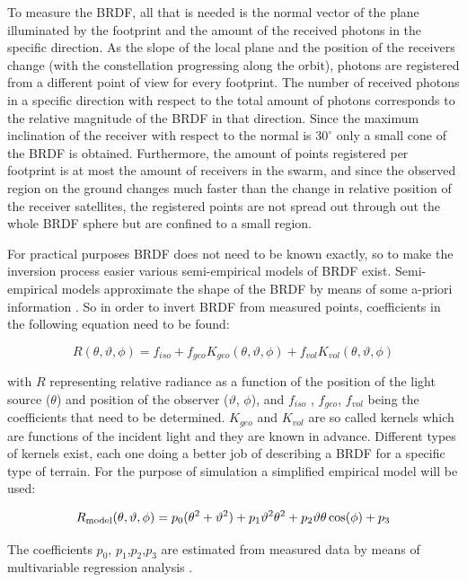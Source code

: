 To measure the \ac{BRDF}, all that is needed is the normal vector of the plane illuminated by the footprint and the amount of the received photons in the specific direction. As the slope of the local plane and the position of the receivers change (with the constellation progressing along the orbit), photons are registered from a different point of view for every footprint. The number of received photons in a specific direction with respect to the total amount of photons corresponds to the relative magnitude of the \ac{BRDF} in that direction. Since the maximum inclination of the receiver with respect to the normal is $30^\circ$ only a small cone of the \ac{BRDF} is obtained. Furthermore, the amount of points registered per footprint is at most the amount of receivers in the swarm, and since the observed region on the ground changes much faster than the change in relative position of the receiver satellites, the registered points are not spread out through out the whole \ac{BRDF} sphere but are confined to a small region. 

For practical purposes \ac{BRDF} does not need to be known exactly, so to make the inversion process easier various semi-empirical models of \ac{BRDF} exist. Semi-empirical models approximate the shape of the \ac{BRDF} by means of some a-priori information \cite{BRDFwanner}. So in order to invert \ac{BRDF} from measured points, coefficients in the following equation need to be found:

\[
R(\theta ,\vartheta ,\phi ) = f_{iso}  + f_{geo} K_{geo} (\theta ,\vartheta ,\phi ) + f_{vol} K_{vol} (\theta ,\vartheta ,\phi )
\]


with $R$ representing relative radiance as a function of the position of the light source ($\theta$) and position of the observer ($\vartheta$, $\phi$), and $f_{iso}$  , $f_{geo}$, $f_{vol}$  being the coefficients that need to be determined. $K_{geo}$ and $K_{vol}$ are so called kernels which are functions of the incident light and they are known in advance. Different types of kernels exist, each one doing a better job of describing a BRDF for a specific type of terrain. 
For the purpose of simulation a simplified empirical model will be used:

\[
R_{{\rm{model}}} (\theta ,\vartheta ,\phi ){\rm{ }} = {\rm{ }}p_0 (\theta _{}^2  + \vartheta _{}^2 ) + p_1 \vartheta _{}^2 \theta _{}^2  + p_2 \vartheta \theta \cos (\phi ) + p_3 
\]

The coefficients $p_0$, $p_1$,$p_2$,$p_3$ are estimated from measured data by means of multivariable regression analysis \cite{BRDFrob}. 

